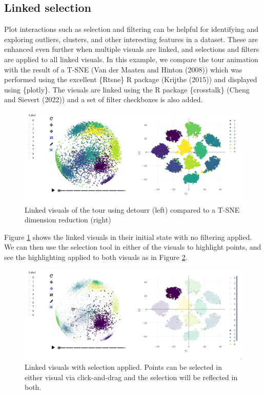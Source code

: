 \hypertarget{sec:casestudylinked}{%
\subsection{Linked selection}\label{sec:casestudylinked}}

Plot interactions such as selection and filtering can be helpful for identifying and exploring outliers, clusters, and other interesting features in a dataset. These are enhanced even further when multiple visuals are linked, and selections and filters are applied to all linked visuals. In this example, we compare the tour animation with the result of a T-SNE (Van der Maaten and Hinton (2008)) which was performed using the excellent \{Rtsne\} R package (Krijthe (2015)) and displayed using \{plotly\}. The visuals are linked using the R package \{crosstalk\} (Cheng and Sievert (2022)) and a set of filter checkboxes is also added.

\begin{figure}
\includegraphics[width=\textwidth]{figures/mnist/case-study-linked-brushing-full} \caption{Linked visuals of the tour using {detourr} (left) compared to a T-SNE dimension reduction (right)}\label{fig:linked-tsne-full}
\end{figure}

Figure \ref{fig:linked-tsne-full} shows the linked visuals in their initial state with no filtering applied. We can then use the selection tool in either of the visuals to highlight points, and see the highlighting applied to both visuals as in Figure \ref{fig:linked-tsne-selection}.

\begin{figure}
\includegraphics[width=\textwidth]{figures/mnist/case-study-linked-brushing-selection} \caption{Linked visuals with selection applied. Points can be selected in either visual via click-and-drag and the selection will be reflected in both.}\label{fig:linked-tsne-selection}
\end{figure}


